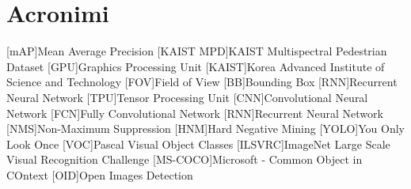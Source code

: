 \chapter*{Acronimi}
\begin{acronym}[CAGD]
    [mAP]{Mean Average Precision}
    [KAIST MPD]{KAIST Multispectral Pedestrian Dataset}
    [GPU]{Graphics Processing Unit}
    [KAIST]{Korea Advanced Institute of Science and Technology}
    [FOV]{Field of View}
    [BB]{Bounding Box}
    [RNN]{Recurrent Neural Network}
    [TPU]{Tensor Processing Unit}
    [CNN]{Convolutional Neural Network}
    [FCN]{Fully Convolutional Network}
    [RNN]{Recurrent Neural Network}
    [NMS]{Non-Maximum Suppression}
    [HNM]{Hard Negative Mining}
    [YOLO]{You Only Look Once}
    [VOC]{Pascal Visual Object Classes}
    [ILSVRC]{ImageNet Large Scale Visual Recognition Challenge}
    [MS-COCO]{Microsoft - Common Object in COntext}
    [OID]{Open Images Detection}
\end{acronym}
